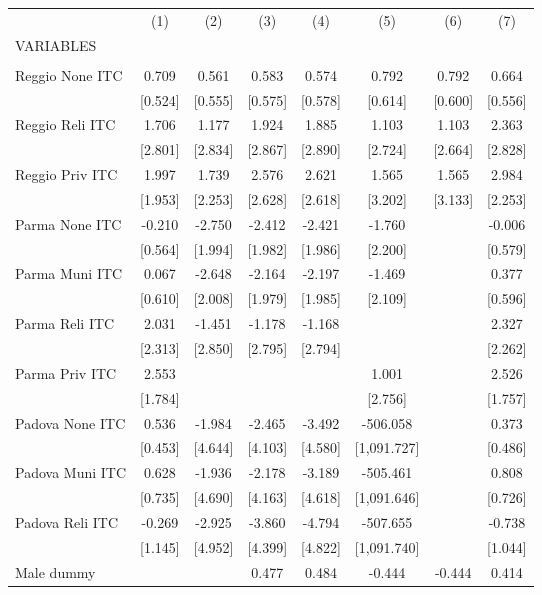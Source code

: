 \begin{tabular}{lccccccc} \hline
 & (1) & (2) & (3) & (4) & (5) & (6) & (7) \\
VARIABLES &  &  &  &  &  &  &  \\ \hline
 &  &  &  &  &  &  &  \\
Reggio None ITC & 0.709 & 0.561 & 0.583 & 0.574 & 0.792 & 0.792 & 0.664 \\
 & [0.524] & [0.555] & [0.575] & [0.578] & [0.614] & [0.600] & [0.556] \\
Reggio Reli ITC & 1.706 & 1.177 & 1.924 & 1.885 & 1.103 & 1.103 & 2.363 \\
 & [2.801] & [2.834] & [2.867] & [2.890] & [2.724] & [2.664] & [2.828] \\
Reggio Priv ITC & 1.997 & 1.739 & 2.576 & 2.621 & 1.565 & 1.565 & 2.984 \\
 & [1.953] & [2.253] & [2.628] & [2.618] & [3.202] & [3.133] & [2.253] \\
Parma None ITC & -0.210 & -2.750 & -2.412 & -2.421 & -1.760 &  & -0.006 \\
 & [0.564] & [1.994] & [1.982] & [1.986] & [2.200] &  & [0.579] \\
Parma Muni ITC & 0.067 & -2.648 & -2.164 & -2.197 & -1.469 &  & 0.377 \\
 & [0.610] & [2.008] & [1.979] & [1.985] & [2.109] &  & [0.596] \\
Parma Reli ITC & 2.031 & -1.451 & -1.178 & -1.168 &  &  & 2.327 \\
 & [2.313] & [2.850] & [2.795] & [2.794] &  &  & [2.262] \\
Parma Priv ITC & 2.553 &  &  &  & 1.001 &  & 2.526 \\
 & [1.784] &  &  &  & [2.756] &  & [1.757] \\
Padova None ITC & 0.536 & -1.984 & -2.465 & -3.492 & -506.058 &  & 0.373 \\
 & [0.453] & [4.644] & [4.103] & [4.580] & [1,091.727] &  & [0.486] \\
Padova Muni ITC & 0.628 & -1.936 & -2.178 & -3.189 & -505.461 &  & 0.808 \\
 & [0.735] & [4.690] & [4.163] & [4.618] & [1,091.646] &  & [0.726] \\
Padova Reli ITC & -0.269 & -2.925 & -3.860 & -4.794 & -507.655 &  & -0.738 \\
 & [1.145] & [4.952] & [4.399] & [4.822] & [1,091.740] &  & [1.044] \\
Male dummy &  &  & 0.477 & 0.484 & -0.444 & -0.444 & 0.414 \\

\end{tabular}
